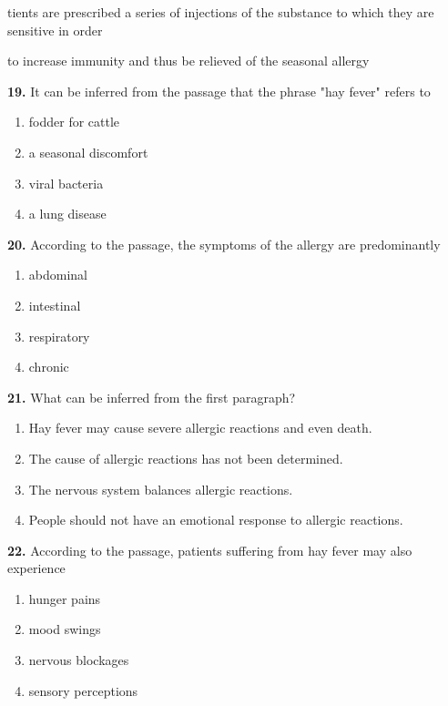 \documentclass[12pt]{article}
\begin{document}
tients are prescribed a series of injections of the substance to which they are sensitive in order\par
to increase immunity and thus be relieved of the seasonal allergy\par
\endgroup
\medskip
\noindent\textbf{19.} It can be inferred from the passage that the phrase "hay fever" refers to
\begin{enumerate}[label=(\Alph*),leftmargin=*,itemsep=0.2em]
\item fodder for cattle
\item a seasonal discomfort
\item viral bacteria
\item a lung disease
\end{enumerate}
\par
\vspace{0.25\baselineskip}
\noindent\textbf{20.} According to the passage, the symptoms of the allergy are predominantly
\begin{enumerate}[label=(\Alph*),leftmargin=*,itemsep=0.2em]
\item abdominal
\item intestinal
\item respiratory
\item chronic
\end{enumerate}
\par
\vspace{0.25\baselineskip}
\noindent\textbf{21.} What can be inferred from the first paragraph?
\begin{enumerate}[label=(\Alph*),leftmargin=*,itemsep=0.2em]
\item Hay fever may cause severe allergic reactions and even death.
\item The cause of allergic reactions has not been determined.
\item The nervous system balances allergic reactions.
\item People should not have an emotional response to allergic reactions.
\end{enumerate}
\par
\vspace{0.25\baselineskip}
\noindent\textbf{22.} According to the passage, patients suffering from hay fever may also experience
\begin{enumerate}[label=(\Alph*),leftmargin=*,itemsep=0.2em]
\item hunger pains
\item mood swings
\item nervous blockages
\item sensory perceptions
\end{enumerate}
\end{document}
